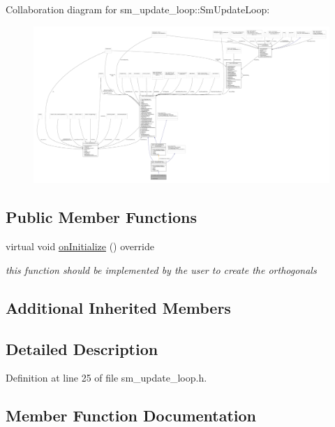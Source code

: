 Collaboration diagram for sm\+\_\+update\+\_\+loop\+:\+:Sm\+Update\+Loop\+:
\nopagebreak
\begin{figure}[H]
\begin{center}
\leavevmode
\includegraphics[width=350pt]{structsm__update__loop_1_1SmUpdateLoop__coll__graph}
\end{center}
\end{figure}
\subsection*{Public Member Functions}
\begin{DoxyCompactItemize}
\item 
virtual void \hyperlink{structsm__update__loop_1_1SmUpdateLoop_a7434ac83f9a7a1732b5814cb307522a6}{on\+Initialize} () override
\begin{DoxyCompactList}\small\item\em this function should be implemented by the user to create the orthogonals \end{DoxyCompactList}\end{DoxyCompactItemize}
\subsection*{Additional Inherited Members}


\subsection{Detailed Description}


Definition at line 25 of file sm\+\_\+update\+\_\+loop.\+h.



\subsection{Member Function Documentation}
\mbox{\label{structsm__update__loop_1_1SmUpdateLoop_a7434ac83f9a7a1732b5814cb307522a6}} 
